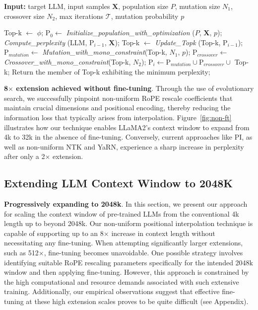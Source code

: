 \begin{algorithm}[t]
	\small
	\caption{The search algorithm}
	\textbf{Input:} target LLM, input samples $\mathbf{X}$, population size $P$, mutation size $N_1$, crossover size $N_2$, max iterations $\mathcal{T}$, mutation probability $p$\\

	\begin{algorithmic}[1]
		\label{alg:search}
		\STATE Top-k $\leftarrow$ $\phi$;	
		\STATE $\text{P}_0 \leftarrow$ \textit{Initialize\_population\_with\_optimization} ($P$, $\mathbf{X}$, $p$);
		\STATE \textit{Compute\_perplexity} (LLM, $\text{P}_{i-1}$, $\mathbf{X}$);
		\STATE Top-k $\leftarrow$ \textit{Update\_Topk} (Top-k, $\text{P}_{i-1}$);
		\STATE $\text{P}_{mutation} \leftarrow$ \textit{Mutation\_with\_mono\_constraint}(Top-k, $N_1$, $p$);
		\STATE $\text{P}_{crossover} \leftarrow$ \textit{Crossover\_with\_mono\_constraint}(Top-k, $N_2$);
		\STATE $\text{P}_i \leftarrow \text{P}_{mutation} \cup \text{P}_{crossover} \cup$ Top-k;
		\ENDFOR
		\STATE Return the member of Top-k exhibiting the minimum perplexity;
	\end{algorithmic}
\end{algorithm}

\textbf{8$\times$ extension achieved without fine-tuning}. Through the use of evolutionary search, we successfully pinpoint non-uniform RoPE rescale coefficients that maintain crucial dimensions and positional encoding, thereby reducing the information loss that typically arises from interpolation. Figure~\ref{fig:non-ft} illustrates how our technique enables LLaMA2’s context window to expand from 4k to 32k in the absence of fine-tuning. Conversely, current approaches like PI, as well as non-uniform NTK and YaRN, experience a sharp increase in perplexity after only a 2$\times$ extension.

\subsection{Extending LLM Context Window to 2048K}
\label{sec:extendto2048k}

\textbf{Progressively expanding to 2048k}. In this section, we present our approach for scaling the context window of pre-trained LLMs from the conventional 4k length up to beyond 2048k. Our non-uniform positional interpolation technique is capable of supporting up to an 8$\times$ increase in context length without necessitating any fine-tuning. When attempting significantly larger extensions, such as 512$\times$, fine-tuning becomes unavoidable. One possible strategy involves identifying suitable RoPE rescaling parameters specifically for the intended 2048k window and then applying fine-tuning. However, this approach is constrained by the high computational and resource demands associated with such extensive training. Additionally, our empirical observations suggest that effective fine-tuning at these high extension scales proves to be quite difficult (see Appendix).

